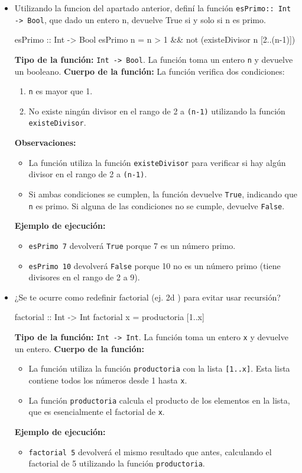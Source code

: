\documentclass{article}
\begin{document}
\begin{itemize}
    \item 
Utilizando la funcion del apartado anterior, definí la función \verb|esPrimo:: Int -> Bool|, que dado un entero n, devuelve True si y solo si n es primo.
\begin{haskell}
esPrimo :: Int -> Bool
esPrimo n = n > 1 && not (existeDivisor n [2..(n-1)])
\end{haskell}
\textbf{Tipo de la función:} \verb|Int -> Bool|. La función toma un entero \verb|n| y devuelve un booleano.
\textbf{Cuerpo de la función:} La función verifica dos condiciones:
\begin{enumerate}
\item \verb|n| es mayor que 1.
\item No existe ningún divisor en el rango de 2 a \verb|(n-1)| utilizando la función \verb|existeDivisor|.
\end{enumerate}
\textbf{Observaciones:}
\begin{itemize}
\item La función utiliza la función \verb|existeDivisor| para verificar si hay algún divisor en el rango de 2 a \verb|(n-1)|.
\item Si ambas condiciones se cumplen, la función devuelve \verb|True|, indicando que \verb|n| es primo. Si alguna de las condiciones no se cumple, devuelve \verb|False|.
\end{itemize}
\textbf{Ejemplo de ejecución:}
\begin{itemize}
\item \verb|esPrimo 7| devolverá \verb|True| porque 7 es un número primo.
\item \verb|esPrimo 10| devolverá \verb|False| porque 10 no es un número primo (tiene divisores en el rango de 2 a 9).
\end{itemize}

    \item 
¿Se te ocurre como redefinir factorial (ej. 2d ) para evitar usar recursión?
\begin{haskell}
factorial :: Int -> Int
factorial x = productoria [1..x]
\end{haskell} 
\textbf{Tipo de la función:} \verb|Int -> Int|. La función toma un entero \verb|x| y devuelve un entero. 
\textbf{Cuerpo de la función:}
\begin{itemize}
\item 
La función utiliza la función \verb|productoria| con la lista \verb|[1..x]|. Esta lista contiene todos los números desde 1 hasta \verb|x|.
\item 
La función \verb|productoria| calcula el producto de los elementos en la lista, que es esencialmente el factorial de \verb|x|.
\end{itemize}
\textbf{Ejemplo de ejecución:}
\begin{itemize}
\item \verb|factorial 5| devolverá el mismo resultado que antes, calculando el factorial de 5 utilizando la función \verb|productoria|.
\end{itemize}


\end{itemize}
\end{document}
